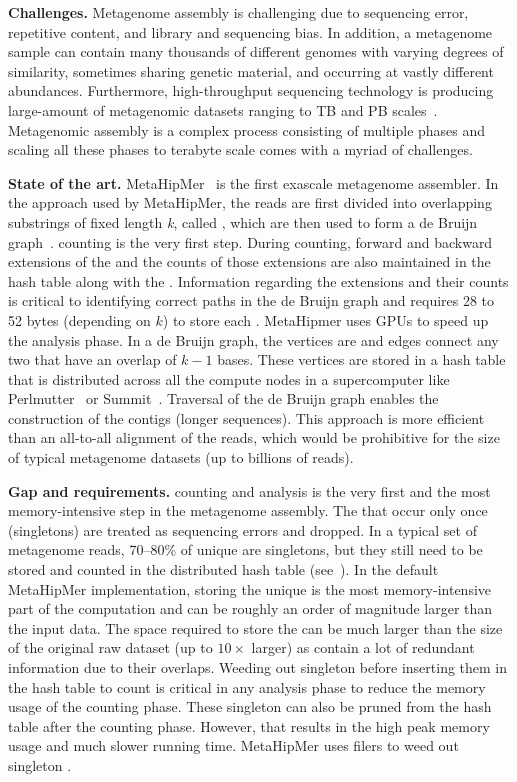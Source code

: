 \noindent
\textbf{Challenges.}
Metagenome assembly is challenging due to sequencing error, repetitive content, and library and sequencing bias. In addition, a metagenome sample can contain many thousands of different genomes with varying degrees of similarity, sometimes sharing genetic material, and occurring at vastly different abundances.
%
Furthermore, high-throughput sequencing technology is producing large-amount of metagenomic datasets ranging to TB and PB scales~\cite{hofmeyr2020terabase}. Metagenomic assembly is a complex process consisting of multiple phases and scaling all these phases to terabyte scale comes with a myriad of challenges.

\noindent
\textbf{State of the art.}
MetaHipMer~\cite{GeorganasEHG18,hofmeyr2020terabase} is the first exascale metagenome assembler.
In the approach used by MetaHipMer, the reads are first divided into overlapping substrings of fixed length \emph{k}, called \emph{\kmers}, which are then used to form a de Bruijn graph~\cite{CompeauPeTe11}.
\Kmer counting is the very first step. During \kmer counting, forward and backward extensions of the \kmer and the counts of those extensions are also maintained in the hash table along with the \kmer. Information regarding the extensions and their counts is critical to identifying correct paths in the de Bruijn graph and requires 28 to 52 bytes (depending on $k$) to store each \kmer.
MetaHipmer uses GPUs to speed up the \kmer analysis phase.
In a de Bruijn graph, the vertices are \kmers and edges connect any two \kmers that have an overlap of $k-1$ bases. These vertices are stored in a hash table that is distributed across all the compute nodes in a supercomputer like Perlmutter~\cite{perlmutter} or Summit~\cite{summit}.
Traversal of the de Bruijn graph enables the construction of the contigs (longer sequences).  This approach is more efficient than an all-to-all alignment of the reads, which would be prohibitive for the size of typical metagenome datasets (up to billions of reads).

\noindent
\textbf{Gap and requirements.}
\Kmer counting and analysis is the very first and the most memory-intensive step in the metagenome assembly. The \kmers that occur only once (singletons) are treated as sequencing errors and dropped. In a typical set of metagenome reads, 70--80\% of unique \kmers are singletons, but they still need to be stored and counted in the distributed hash table (see~).
In the default MetaHipMer implementation, storing the unique \kmers is the most memory-intensive part of the computation and can be roughly an order of magnitude larger than the input data.  The space required to store the \kmers can be much larger than the size of the original raw dataset (up to $10\times$ larger) as \kmers contain a lot of redundant information due to their overlaps.
Weeding out singleton \kmers before inserting them in the hash table to count is critical in any \kmer analysis phase to reduce the memory usage of the counting phase. These singleton \kmers can also be pruned from the hash table after the counting phase. However, that results in the high peak memory usage and much slower running time. MetaHipMer uses filers to weed out singleton \kmers.

